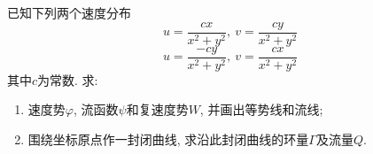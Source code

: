 \begin{problem}[问题6.1]
已知下列两个速度分布
\begin{equation}\label{eq60101}
u = \frac{cx}{x^2 + y^2},{~} v = \frac{cy}{x^2+y^2}
\end{equation}
\begin{equation}\label{eq60102}
u = \frac{-cy}{x^2 + y^2},{~} v = \frac{cx}{x^2+y^2}
\end{equation}
其中$c$为常数. 求:
\begin{enumerate}
\item 速度势$\varphi$, 流函数$\psi$和复速度势$W$, 并画出等势线和流线;
\item 围绕坐标原点作一封闭曲线, 求沿此封闭曲线的环量$\Gamma$及流量$Q$.
\end{enumerate}
\end{problem}
